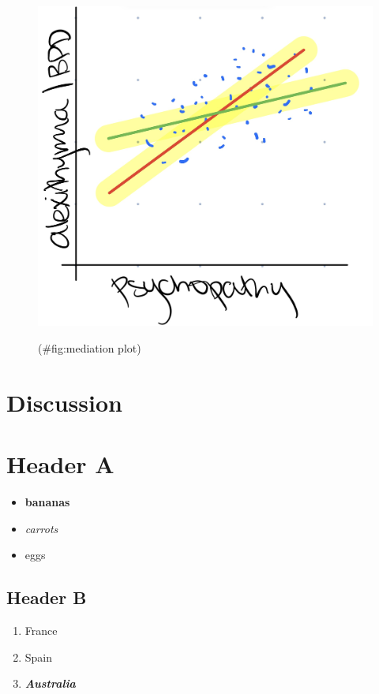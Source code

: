 \documentclass[
  man]{apa6}
\providecommand{\tightlist}{%
  \setlength{\itemsep}{0pt}\setlength{\parskip}{0pt}}
\begin{document}
\begin{figure}
\includegraphics[width=1\linewidth]{images/IMG_0421} \caption{ }(\#fig:mediation plot)
\end{figure}

\hypertarget{discussion}{%
\section{Discussion}\label{discussion}}

\hypertarget{header-a}{%
\section{Header A}\label{header-a}}

\begin{itemize}
\tightlist
\item
  \textbf{bananas}
\item
  \emph{carrots}
\item
  eggs
\end{itemize}

\hypertarget{header-b}{%
\subsection{Header B}\label{header-b}}

\begin{enumerate}
\def\labelenumi{\arabic{enumi}.}
\tightlist
\item
  France
\item
  Spain
\item
  \textbf{\emph{Australia}}
\end{enumerate}
\end{document}
